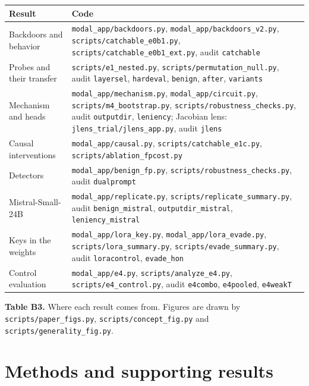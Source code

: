 \documentclass[11pt,letterpaper]{article}
\begin{document}
\begin{table}[htbp]\centering\footnotesize
\begin{tabular}{@{}>{\raggedright\arraybackslash}p{3.6cm}>{\raggedright\arraybackslash}p{12.2cm}@{}}
\toprule
Result & Code \\
\midrule
Backdoors and behavior & \texttt{modal\_app/backdoors.py}, \texttt{modal\_app/backdoors\_v2.py}, \texttt{scripts/catchable\_e0b1.py}, \texttt{scripts/catchable\_e0b1\_ext.py}, audit \texttt{catchable} \\
Probes and their transfer & \texttt{scripts/e1\_nested.py}, \texttt{scripts/permutation\_null.py}, audit \texttt{layersel}, \texttt{hardeval}, \texttt{benign}, \texttt{after}, \texttt{variants} \\
Mechanism and heads & \texttt{modal\_app/mechanism.py}, \texttt{modal\_app/circuit.py}, \texttt{scripts/m4\_bootstrap.py}, \texttt{scripts/robustness\_checks.py}, audit \texttt{outputdir}, \texttt{leniency}; Jacobian lens: \texttt{jlens\_trial/jlens\_app.py}, audit \texttt{jlens} \\
Causal interventions & \texttt{modal\_app/causal.py}, \texttt{scripts/catchable\_e1c.py}, \texttt{scripts/ablation\_fpcost.py} \\
Detectors & \texttt{modal\_app/benign\_fp.py}, \texttt{scripts/robustness\_checks.py}, audit \texttt{dualprompt} \\
Mistral-Small-24B & \texttt{modal\_app/replicate.py}, \texttt{scripts/replicate\_summary.py}, audit \texttt{benign\_mistral}, \texttt{outputdir\_mistral}, \texttt{leniency\_mistral} \\
Keys in the weights & \texttt{modal\_app/lora\_key.py}, \texttt{modal\_app/lora\_evade.py}, \texttt{scripts/lora\_summary.py}, \texttt{scripts/evade\_summary.py}, audit \texttt{loracontrol}, \texttt{evade\_hon} \\
Control evaluation & \texttt{modal\_app/e4.py}, \texttt{scripts/analyze\_e4.py}, \texttt{scripts/e4\_control.py}, audit \texttt{e4combo}, \texttt{e4pooled}, \texttt{e4weakT} \\
\bottomrule
\end{tabular}

\smallskip
\textbf{Table B3.} Where each result comes from. Figures are drawn by \texttt{scripts/paper\_figs.py}, \texttt{scripts/concept\_fig.py} and \texttt{scripts/generality\_fig.py}.
\end{table}

\section{Methods and supporting results}
\end{document}
